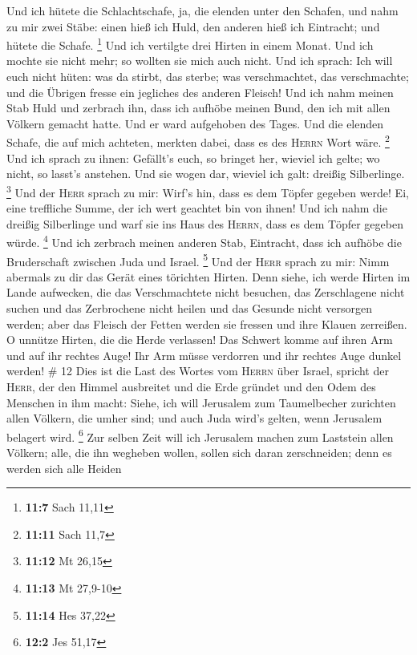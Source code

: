 Und ich hütete die Schlachtschafe, ja, die elenden unter den Schafen,
und nahm zu mir zwei Stäbe: einen hieß ich Huld, den anderen hieß ich
Eintracht; und hütete die Schafe. \footnote{\textbf{11:7} Sach 11,11}
 Und ich vertilgte drei Hirten in einem Monat. Und ich
mochte sie nicht mehr; so wollten sie mich auch nicht. 
Und ich sprach: Ich will euch nicht hüten: was da stirbt, das sterbe;
was verschmachtet, das verschmachte; und die Übrigen fresse ein
jegliches des anderen Fleisch!  Und ich nahm meinen Stab
Huld und zerbrach ihn, dass ich aufhöbe meinen Bund, den ich mit allen
Völkern gemacht hatte.  Und er ward aufgehoben des Tages.
Und die elenden Schafe, die auf mich achteten, merkten dabei, dass es
des \textsc{Herrn} Wort wäre. \footnote{\textbf{11:11} Sach 11,7}
 Und ich sprach zu ihnen: Gefällt's euch, so bringet her,
wieviel ich gelte; wo nicht, so lasst's anstehen. Und sie wogen dar,
wieviel ich galt: dreißig Silberlinge. \footnote{\textbf{11:12} Mt 26,15}
 Und der \textsc{Herr} sprach zu mir: Wirf's hin, dass es
dem Töpfer gegeben werde! Ei, eine treffliche Summe, der ich wert
geachtet bin von ihnen! Und ich nahm die dreißig Silberlinge und warf
sie ins Haus des \textsc{Herrn}, dass es dem Töpfer gegeben würde.
\footnote{\textbf{11:13} Mt 27,9-10}  Und ich zerbrach
meinen anderen Stab, Eintracht, dass ich aufhöbe die Bruderschaft
zwischen Juda und Israel. \footnote{\textbf{11:14} Hes 37,22}
 Und der \textsc{Herr} sprach zu mir: Nimm abermals zu
dir das Gerät eines törichten Hirten.  Denn siehe, ich
werde Hirten im Lande aufwecken, die das Verschmachtete nicht besuchen,
das Zerschlagene nicht suchen und das Zerbrochene nicht heilen und das
Gesunde nicht versorgen werden; aber das Fleisch der Fetten werden sie
fressen und ihre Klauen zerreißen.  O unnütze Hirten, die
die Herde verlassen! Das Schwert komme auf ihren Arm und auf ihr rechtes
Auge! Ihr Arm müsse verdorren und ihr rechtes Auge dunkel werden! \# 12
 Dies ist die Last des Wortes vom \textsc{Herrn} über
Israel, spricht der \textsc{Herr}, der den Himmel ausbreitet und die
Erde gründet und den Odem des Menschen in ihm macht: 
Siehe, ich will Jerusalem zum Taumelbecher zurichten allen Völkern, die
umher sind; und auch Juda wird's gelten, wenn Jerusalem belagert wird.
\footnote{\textbf{12:2} Jes 51,17}  Zur selben Zeit will
ich Jerusalem machen zum Laststein allen Völkern; alle, die ihn wegheben
wollen, sollen sich daran zerschneiden; denn es werden sich alle Heiden
